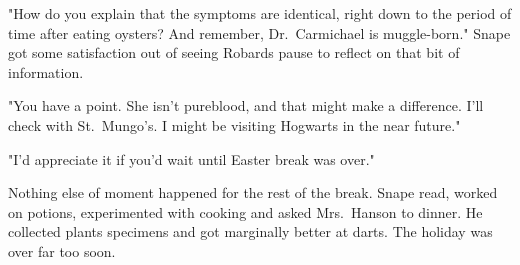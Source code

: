"How do you explain that the symptoms are identical, right down to the period of time after eating oysters? And remember, Dr.~Carmichael is muggle-born." Snape got some satisfaction out of seeing Robards pause to reflect on that bit of information.

"You have a point. She isn't pureblood, and that might make a difference. I'll check with St.~Mungo's. I might be visiting Hogwarts in the near future."

"I'd appreciate it if you'd wait until Easter break was over."

Nothing else of moment happened for the rest of the break. Snape read, worked on potions, experimented with cooking and asked Mrs.~Hanson to dinner. He collected plants specimens and got marginally better at darts. The holiday was over far too soon. 


